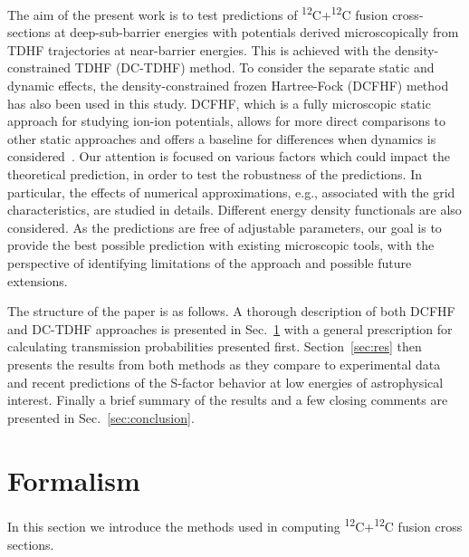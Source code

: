 The aim of the present work is to test predictions of  \textsuperscript{12}C+\textsuperscript{12}C fusion cross-sections 
at deep-sub-barrier energies with potentials derived microscopically from TDHF trajectories at near-barrier energies.
This is achieved with the density-constrained TDHF (DC-TDHF) method. 
To consider the separate static and dynamic effects, the density-constrained frozen Hartree-Fock (DCFHF) method has also been used in this study.
DCFHF, which is a fully microscopic static approach for studying ion-ion potentials, 
allows for more direct comparisons to other static approaches and offers a baseline for differences when dynamics is considered~\protect\cite{simenel2017}. 
Our attention is focused on various factors which could impact the theoretical prediction, in order to test the robustness of the predictions. 
In particular, the effects of numerical approximations, e.g., associated with the grid characteristics, are studied in details. 
Different energy density functionals are also considered.
As the predictions are free of adjustable parameters, our goal is to provide the best possible prediction with existing microscopic tools, 
with the perspective of identifying limitations of the approach and possible future extensions.

The structure of the paper is as follows. A thorough description of both DCFHF and DC-TDHF approaches is presented in Sec.~\ref{sec:form} 
with a general prescription for calculating transmission probabilities presented first. 
Section~\ref{sec:res} then presents the results from both methods as they compare to experimental data 
and recent predictions of the S-factor behavior at low energies of astrophysical interest. 
Finally a brief summary of the results and a few closing comments are presented in Sec.~\ref{sec:conclusion}.


\section{Formalism}
\label{sec:form}
In this section we introduce the methods used in computing \textsuperscript{12}C+\textsuperscript{12}C fusion cross sections.
